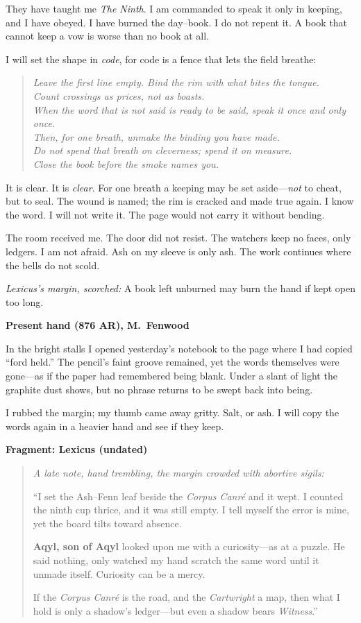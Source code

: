 \documentclass[11pt]{article}
\numberwithin{equation}{section} %
\theoremstyle{plain} %
\theoremstyle{definition} %
\theoremstyle{remark} %
\begin{document}
They have taught me \emph{The Ninth}. I am commanded to speak it only in keeping, and I have obeyed. I have burned the day–book. I do not repent it. A book that cannot keep a vow is worse than no book at all.

I will set the shape in \emph{code}, for code is a fence that lets the field breathe:

\begin{quote}\small
\textit{Leave the first line empty. Bind the rim with what bites the tongue.\\
Count crossings as prices, not as boasts.\\
When the word that is not said is ready to be said, speak it once and only once.\\
Then, for one breath, unmake the binding you have made.\\
Do not spend that breath on cleverness; spend it on measure.\\
Close the book before the smoke names you.}
\end{quote}

It is clear. It is \emph{clear}. For one breath a keeping may be set aside—\emph{not} to cheat, but to seal. The wound is named; the rim is cracked and made true again. I know the word. I will not write it. The page would not carry it without bending.

The room received me. The door did not resist. The watchers keep no faces, only ledgers. I am not afraid. Ash on my sleeve is only ash. The work continues where the bells do not scold.

\medskip
\noindent\textit{Lexicus’s margin, scorched:} A book left unburned may burn the hand if kept open too long.

\medskip
\noindent\textbf{Present hand (876 AR), M.\ Fenwood}

\noindent In the bright stalls I opened yesterday’s notebook to the page where I had copied ``ford held.'' The pencil’s faint groove remained, yet the words themselves were gone---as if the paper had remembered being blank. Under a slant of light the graphite dust shows, but no phrase returns to be swept back into being.

\noindent I rubbed the margin; my thumb came away gritty. Salt, or ash. I will copy the words again in a heavier hand and see if they keep.

\noindent\textbf{Fragment: Lexicus (undated)}
\begin{quote}\itshape
A late note, hand trembling, the margin crowded with abortive sigils:

``I set the Ash--Fenn leaf beside the \emph{Corpus Canré} and it wept. I counted the ninth cup thrice, and it was still empty. I tell myself the error is mine, yet the board tilts toward absence.

\textbf{Aqyl, son of Aqyl} looked upon me with a curiosity---as at a puzzle. He said nothing, only watched my hand scratch the same word until it unmade itself. Curiosity can be a mercy.

If the \emph{Corpus Canré} is the road, and the \emph{Cartwright} a map, then what I hold is only a shadow's ledger---but even a shadow bears \emph{Witness}.''%
\end{quote}
\end{document}
